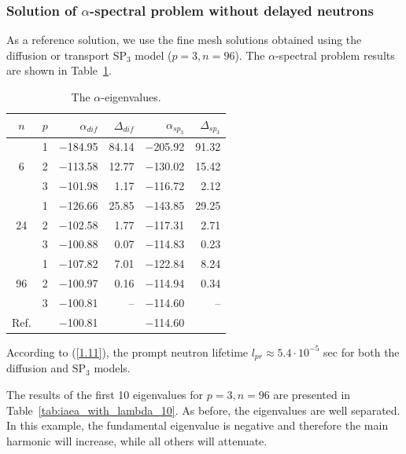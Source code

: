 \documentclass[authoryear]{elsarticle}
\begin{document}
\subsubsection{Solution of $\alpha$-spectral problem without delayed neutrons}
As a reference solution, we use the fine mesh solutions obtained using the diffusion or transport $\mathrm{SP_3}$ model ($ p = 3, n = 96 $). 
The $\alpha$-spectral problem results are shown in Table~\ref{tab:iaea_with_alpha}.

\begin{table}[h]
\caption{The $\alpha$-eigenvalues.}
\label{tab:iaea_with_alpha}
\begin{center}
\begin{tabular}{c c r r r r}
\hline
$n$ & $p$ & $\alpha_{dif}$ & $\Delta_{dif}$ &$\alpha_{sp_3}$& $\Delta_{sp_3}$ \\
\hline
	& 1	& $-$184.95 & 84.14 & $-$205.92 & 91.32\\
6	& 2	& $-$113.58 & 12.77 & $-$130.02 & 15.42\\
	& 3	& $-$101.98 &  1.17 & $-$116.72 &  2.12\\ 
\hline
	& 1	& $-$126.66 & 25.85 & $-$143.85 & 29.25\\
24& 2	& $-$102.58 &  1.77 & $-$117.31 &  2.71\\
	& 3	& $-$100.88 &  0.07 & $-$114.83 &  0.23\\ 
\hline
	& 1	& $-$107.82 &  7.01 & $-$122.84 & 8.24\\
96& 2	& $-$100.97 &  0.16 & $-$114.94 & 0.34\\
	& 3	& $-$100.81 &	 -- & $-$114.60 &  -- \\ 
\hline
Ref.& & $-$100.81 & & $-$114.60 \\ 
\hline
\end{tabular}
\end{center}
\end{table}

According to (\ref{1.11}), the prompt neutron lifetime $l_{pr} \approx 5.4 \cdot 10^{-5}$ sec for both the diffusion and $\mathrm{SP_3}$ models.

The results of the first 10 eigenvalues for $ p = 3, n = 96 $ are presented in Table~\ref{tab:iaea_with_lambda_10}.
As before, the eigenvalues are well separated.
In this example, the fundamental eigenvalue is negative and therefore the main harmonic will increase, while all others will attenuate. 
\end{document}
